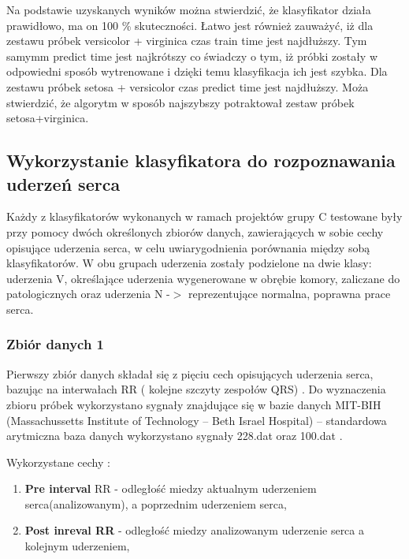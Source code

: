 \documentclass[[10pt,a4paper]{article}
\begin{document}
\begin{enumerate}
\noindent Na podstawie uzyskanych wyników można stwierdzić, że klasyfikator działa prawidłowo, ma on 100 \% skuteczności. Łatwo jest również zauważyć, iż dla zestawu próbek versicolor +  virginica czas train time jest najdłuższy. Tym samymm predict time jest najkrótszy co świadczy o tym, iż próbki zostały w odpowiedni sposób wytrenowane i dzięki temu klasyfikacja ich jest szybka. Dla zestawu próbek setosa + versicolor czas predict time jest najdłuższy. Moża stwierdzić, że algorytm w sposób najszybszy potraktował zestaw próbek setosa+virginica. 

\noindent 

\noindent 

\subsection{Wykorzystanie klasyfikatora do rozpoznawania uderzeń serca}

\noindent Każdy z klasyfikatorów wykonanych w ramach projektów grupy C testowane były przy pomocy dwóch określonych zbiorów danych, zawierających w sobie cechy opisujące uderzenia serca, w celu uwiarygodnienia porównania między sobą klasyfikatorów. W obu grupach uderzenia zostały podzielone na dwie klasy: uderzenia V, określające uderzenia wygenerowane w obrębie komory, zaliczane do patologicznych oraz uderzenia N -$>$ reprezentujące normalna, poprawna prace serca.

\subsubsection{ Zbiór danych 1}

\noindent Pierwszy zbiór danych składał się z pięciu cech opisujących uderzenia serca, bazując na interwałach RR ( kolejne szczyty zespołów QRS) . Do wyznaczenia zbioru próbek wykorzystano sygnały znajdujące się w bazie danych MIT-BIH (Massachussetts Institute of Technology -- Beth Israel Hospital) -- standardowa arytmiczna baza danych wykorzystano sygnały 228.dat oraz 100.dat .

\noindent Wykorzystane cechy : 

\begin{enumerate}
\item  \textbf{Pre interval} RR - odległość miedzy aktualnym uderzeniem serca(analizowanym), a poprzednim uderzeniem serca,

\item  \textbf{Post inreval RR} - odległość miedzy analizowanym uderzenie serca a kolejnym uderzeniem,


\end{enumerate}
\end{enumerate}
\end{document}
